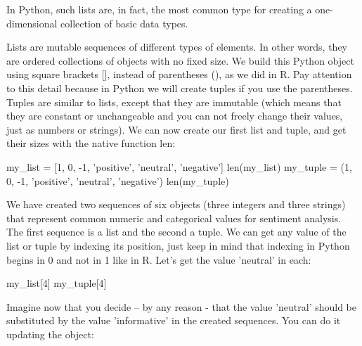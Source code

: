 


In Python, such lists are, in fact, the most common type for creating
a one-dimensional collection of basic data types. 

Lists are mutable sequences of different types of elements. In other
words, they are ordered collections of objects with no fixed size. We
build this Python object using square brackets [], instead of
parentheses (), as we did in R. Pay attention to this detail because
in Python we will create tuples if you use the parentheses. Tuples are
similar to lists, except that they are immutable (which means that
they are constant or unchangeable and you can not freely change their
values, just as numbers or strings).  We can now create our first list
and tuple, and get their sizes with the native function len:

\begin{examplepy}
my_list = [1, 0, -1, 'positive', 'neutral', 'negative']
len(my_list)
my_tuple = (1, 0, -1, 'positive', 'neutral', 'negative')
len(my_tuple)
\end{examplepy}



We have created two sequences of six objects (three integers and three strings) that represent common numeric and categorical values for sentiment analysis. The first sequence is a list and the second a tuple. We can get any value of the list or tuple by indexing its position, just keep in mind that indexing in Python begins in 0 and not in 1 like in R. Let's get the value 'neutral' in each:

\begin{examplepy}
my_list[4]
my_tuple[4]
\end{examplepy}

Imagine now that you decide – by any reason - that the value 'neutral' should be substituted by the value 'informative' in the created sequences. You can do it updating the object:


